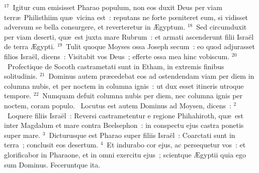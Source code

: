 ${}^{17}$~Igitur cum emisisset Pharao populum, non eos duxit Deus per viam terr\ae\ Philisthiim qu\ae\ vicina est~: reputans ne forte pœniteret eum, si vidisset adversum se bella consurgere, et reverteretur in \AE gyptum.
${}^{18}$~Sed circumduxit per viam deserti, qu\ae\ est juxta mare Rubrum~: et armati ascenderunt filii Isra\"el de terra \AE gypti.
${}^{19}$~Tulit quoque Moyses ossa Joseph secum~: eo quod adjurasset filios Isra\"el, dicens~: Visitabit vos Deus~; efferte ossa mea hinc vobiscum.
${}^{20}$~Profectique de Socoth castrametati sunt in Etham, in extremis finibus solitudinis.
${}^{21}$~Dominus autem pr\ae cedebat eos ad ostendendam viam per diem in columna nubis, et per noctem in columna ignis~: ut dux esset itineris utroque tempore.
${}^{22}$~Numquam defuit columna nubis per diem, nec columna ignis per noctem, coram populo.
~Locutus est autem Dominus ad Moysen, dicens~:
${}^{2}$~Loquere filiis Isra\"el~: Reversi castrametentur e regione Phihahiroth, qu\ae\ est inter Magdalum et mare contra Beelsephon~: in conspectu ejus castra ponetis super mare.
${}^{3}$~Dicturusque est Pharao super filiis Isra\"el~: Coarctati sunt in terra~; conclusit eos desertum.
${}^{4}$~Et indurabo cor ejus, ac persequetur vos~: et glorificabor in Pharaone, et in omni exercitu ejus~; scientque \AE gyptii quia ego sum Dominus. Feceruntque ita.


